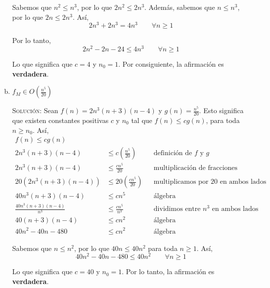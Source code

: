 \documentclass[12pt,letterpaper]{article}
\begin{document}
\begin{enumerate}[a.]
    Sabemos que $n^2 \leq n^3$, por lo que $2n^2 \leq 2n^3$. Además, 
    sabemos que $n \leq n^3$, por lo que $2n \leq 2n^3$. Así, 
    \begin{equation*}
        2n^3 + 2n^3 = 4n^3 \quad \quad \forall n \geq 1
    \end{equation*}

    Por lo tanto, 
    \begin{equation*}
        2n^2 - 2n -24 \leq 4n^3 \quad \quad \forall n \geq 1
    \end{equation*}

    Lo que significa que $c = 4$ y $n_0 = 1$. Por consiguiente, la afirmación
    es \textbf{verdadera}.
    
    \item $f_M \in O(\frac{n^5}{20})$

    \textsc{Solución:} Sean $f(n) = 2n^3(n+3)(n-4)$ y $g(n) = \frac{n^5}{20}$. Esto 
    significa que existen constantes positivas $c$ y $n_0$ tal que 
    $f(n) \leq cg(n)$, para toda $n \geq n_0$. Así, 
    \begin{align*}
        f(n) \leq cg(n) \\
        2n^3(n+3)(n-4) &\leq c \left( \frac{n^5}{20} \right)
        && \text{definición de $f$ y $g$} \\
        2n^3(n+3)(n-4) &\leq \frac{cn^5}{20}
        && \text{multiplicación de fracciones} \\ 
        20(2n^3(n+3)(n-4)) &\leq 20 \left( \frac{cn^5}{20} \right)
        && \text{multiplicamos por $20$ en ambos lados} \\ 
        40n^3(n+3)(n-4) &\leq cn^5
        && \text{álgebra} \\ 
        \frac{40n^3(n+3)(n-4)}{n^3} &\leq \frac{cn^5}{n^3}
        && \text{dividimos entre $n^3$ en ambos lados} \\ 
        40(n+3)(n-4) &\leq cn^2 
        && \text{álgebra} \\ 
        40n^2 - 40n - 480 &\leq cn^2
        && \text{álgebra}
    \end{align*}

    Sabemos que $n \leq n^2$, por lo que $40n \leq 40n^2$ para toda 
    $n \geq 1$. Así, 
    \begin{equation*}
        40n^2 - 40n - 480 \leq 40n^2 \quad \quad \forall n \geq 1
    \end{equation*}

    Lo que significa que $c = 40$ y $n_0 = 1$. Por lo tanto, la afirmación
    es \textbf{verdadera}.
    

\end{enumerate}
\end{document}
